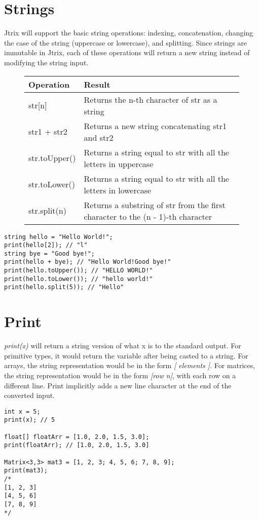 \documentclass[12pt]{report}
\begin{document}
\section{Strings}
Jtrix will support the basic string operations: indexing, concatenation, changing the case of the string (uppercase or lowercase), and splitting. Since strings are immutable in Jtrix, each of these operations will return a new string instead of modifying the string input.
\begin{figure}[h]
\begin{tabular}{|l|l|}
\hline
Operation     & Result                                                                          \\ \hline
str{[}n{]}    & Returns the n-th character of str as a string                                   \\ \hline
str1 + str2   & Returns a new string concatenating str1 and str2                                \\ \hline
str.toUpper() & Returns a string equal to str with all the letters in uppercase                 \\ \hline
str.toLower() & Returns a string equal to str with all the letters in lowercase                 \\ \hline
str.split(n)  & Returns a substring of str from the first character to the (n - 1)-th character \\ \hline
\end{tabular}
\end{figure}
\begin{lstlisting}
string hello = "Hello World!";
print(hello[2]); // "l"
string bye = "Good bye!";
print(hello + bye); // "Hello World!Good bye!"
print(hello.toUpper()); // "HELLO WORLD!"
print(hello.toLower()); // "hello world!"
print(hello.split(5)); // "Hello" 
\end{lstlisting}
\section{Print}
\textit{print(x)} will return a string version of what x is to the standard output. For primitive types, it would return the variable after being casted to a string. For arrays, the string representation would be in the form \textit{[ elements ]}. For matrices, the string representation would be in the form \textit{[row n]}, with each row on a different line. Print implicitly adds a new line character at the end of the converted input.
\begin{lstlisting}
int x = 5;
print(x); // 5

float[] floatArr = [1.0, 2.0, 1.5, 3.0];
print(floatArr); // [1.0, 2.0, 1.5, 3.0]

Matrix<3,3> mat3 = [1, 2, 3; 4, 5, 6; 7, 8, 9];
print(mat3);
/* 
[1, 2, 3]
[4, 5, 6]
[7, 8, 9]
*/
\end{lstlisting}
    
\end{document}

